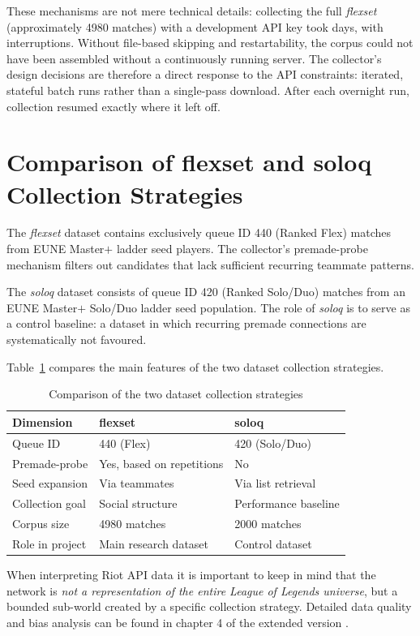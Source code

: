 These mechanisms are not mere technical details: collecting the full \textit{flexset} (approximately 4980 matches) with a development API key took days, with interruptions. Without file-based skipping and restartability, the corpus could not have been assembled without a continuously running server. The collector's design decisions are therefore a direct response to the API constraints: iterated, stateful batch runs rather than a single-pass download. After each overnight run, collection resumed exactly where it left off.

\section{Comparison of flexset and soloq Collection Strategies}

The \textit{flexset} dataset contains exclusively queue ID 440 (Ranked Flex) matches from EUNE Master$+$ ladder seed players. The collector's premade-probe mechanism filters out candidates that lack sufficient recurring teammate patterns.

The \textit{soloq} dataset consists of queue ID 420 (Ranked Solo/Duo) matches from an EUNE Master$+$ Solo/Duo ladder seed population. The role of \textit{soloq} is to serve as a control baseline: a dataset in which recurring premade connections are systematically not favoured.

Table~\ref{tab:dataset-strategy} compares the main features of the two dataset collection strategies.

\begin{table}[H]
\centering
\caption{Comparison of the two dataset collection strategies}
\label{tab:dataset-strategy}
\begin{tabularx}{\textwidth}{|>{\raggedright\arraybackslash}p{4.2cm}|X|X|}
\hline
\textbf{Dimension} & \textbf{flexset} & \textbf{soloq} \\
\hline
Queue ID & 440 (Flex) & 420 (Solo/Duo) \\
Premade-probe & Yes, based on repetitions & No \\
Seed expansion & Via teammates & Via list retrieval \\
Collection goal & Social structure & Performance baseline \\
Corpus size & 4980 matches & 2000 matches \\
Role in project & Main research dataset & Control dataset \\
\hline
\end{tabularx}
\end{table}

When interpreting Riot API data it is important to keep in mind that the network is \emph{not a representation of the entire League of Legends universe}, but a bounded sub-world created by a specific collection strategy. Detailed data quality and bias analysis can be found in chapter 4 of the extended version \cite{premadegraph-full}.
